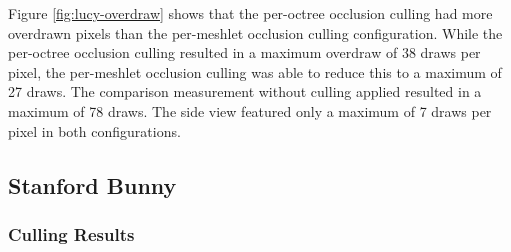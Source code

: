 \noindent
Figure \ref{fig:lucy-overdraw} shows that the per-octree occlusion culling had more 
overdrawn pixels than the per-meshlet occlusion culling configuration. While the 
per-octree occlusion culling resulted in a maximum overdraw of 38 draws per pixel, 
the per-meshlet occlusion culling was able to reduce this to a maximum of 27 draws.
The comparison measurement without culling applied resulted in a maximum of 78 draws. 
The side view featured only a maximum of 7 draws per pixel in both configurations.


\clearpage




\subsection*{Stanford Bunny}

\subsubsection*{Culling Results} \label{subsubsec-culling-results-bunny}


